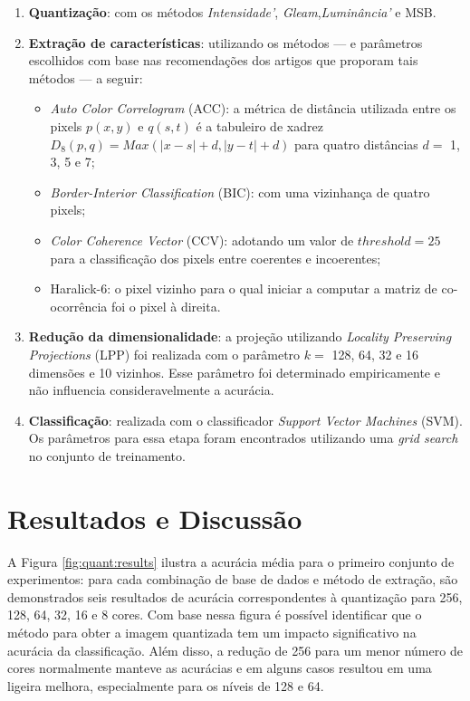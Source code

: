 \begin{enumerate}
\item \textbf{Quantização}: com os métodos \emph{Intensidade'}, \emph{Gleam},\emph{Luminância'} e MSB.
\item \textbf{Extração de características}: utilizando os métodos --- e parâmetros escolhidos com base nas recomendações dos artigos que proporam tais métodos --- a seguir:
  \begin{itemize}
    \item \textit{Auto Color Correlogram} (ACC): a métrica de distância utilizada entre os pixels $p(x,y)$ e $q(s,t)$ é a tabuleiro de xadrez $D_8(p,q) = Max(|x-s| + d, |y-t| + d)$ para quatro distâncias $d =$ 1, 3, 5 e 7;
    \item \textit{Border-Interior Classification} (BIC): com uma vizinhança de quatro pixels;
    \item \textit{Color Coherence Vector} (CCV): adotando um valor de $\mathit{threshold} = 25$ para a classificação dos pixels entre coerentes e incoerentes;
    \item Haralick-6: o pixel vizinho para o qual iniciar a computar a matriz de co-ocorrência foi o pixel à direita.
  \end{itemize}
\item \textbf{Redução da dimensionalidade}: a projeção utilizando \textit{Locality Preserving Projections} (LPP) foi realizada com o parâmetro $k =$ 128, 64, 32 e 16 dimensões e 10 vizinhos. Esse parâmetro foi determinado empiricamente e não influencia consideravelmente a acurácia.
\item \textbf{Classificação}: realizada com o classificador \textit{Support Vector Machines} (SVM). Os parâmetros para essa etapa foram encontrados utilizando uma \textit{grid search} no conjunto de treinamento.
\end{enumerate}

\section{Resultados e Discussão}

A Figura \ref{fig:quant:results} ilustra a acurácia média para o primeiro conjunto de experimentos: para cada combinação de base de dados e método de extração, são demonstrados seis resultados de acurácia correspondentes à quantização para 256, 128, 64, 32, 16 e 8 cores. Com base nessa figura é possível identificar que o método para obter a imagem quantizada tem um impacto significativo na acurácia da classificação. Além disso, a redução de 256 para um menor número de cores normalmente manteve as acurácias e em alguns casos resultou em uma ligeira melhora, especialmente para os níveis de 128 e 64.

